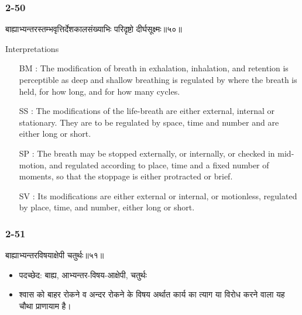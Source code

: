 \begin{frame}[fragile]\frametitle{2-50}
\begin{sanskrit}
बाह्याभ्यन्तरस्तम्भवृत्तिर्देशकालसंख्याभिः परिदृष्टो दीर्घसूक्ष्मः॥५०॥
\end{sanskrit}

Interpretations
\begin{itemize}
\item [BM]: The modification of breath in exhalation, inhalation, and retention is perceptible as deep and shallow breathing is regulated by where the breath is held, for how long, and for how many cycles.
\item [SS]: The modifications of the life-breath are either external, internal or stationary. They are to be regulated by space, time and number and are either long or short.
\item [SP]: The breath may be stopped externally, or internally, or checked in mid-motion, and regulated according to place, time and a fixed number of moments, so that the stoppage is either protracted or brief.
\item [SV]: Its modifications are either external or internal, or motionless, regulated by place, time, and number, either long or short. 
\end{itemize}
\end{frame}

\begin{frame}[fragile]\frametitle{2-51}
\begin{sanskrit}
बाह्याभ्यन्तरविषयाक्षेपी चतुर्थः॥५१॥
\end{sanskrit}

\begin{itemize}
\item पदच्छेद: बाह्य, आभ्यन्तर-विषय-आक्षेपी, चतुर्थः
\item श्वास को बाहर रोकने व अन्दर रोकने के विषय अर्थात कार्य का त्याग या विरोध करने वाला यह चौथा प्राणायाम है।
\end{itemize}	
\end{frame}


